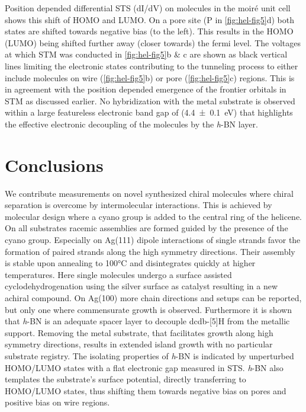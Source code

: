 Position depended differential STS (dI/dV) on molecules in the moir\'e unit cell shows this shift of HOMO and LUMO. On a pore site (P in \autoref{fig:hel-fig5}d) both states are shifted towards negative bias (to the left). This results in the HOMO (LUMO) being shifted further away (closer towards) the fermi level. The voltages at which STM was conducted in \autoref{fig:hel-fig5}b \& c are shown as black vertical lines limiting the electronic states contributing to the tunneling process to either include molecules on wire (\autoref{fig:hel-fig5}b) or pore (\autoref{fig:hel-fig5}c) regions. This is in agreement with the position depended emergence of the frontier orbitals in STM as discussed earlier. No hybridization with the metal substrate is observed within a large featureless electronic band gap of (\SI{4.4 \pm 0.1}{\eV}) that highlights the effective electronic decoupling of the molecules by the \textit{h}-BN layer.


\section{Conclusions}

We contribute measurements on novel synthesized chiral molecules where chiral separation is overcome by intermolecular interactions. This is achieved by molecular design where a cyano group is added to the central ring of the helicene. On all substrates racemic assemblies are formed guided by the presence of the cyano group. Especially on Ag(111) dipole interactions of single strands favor the formation of paired strands along the high symmetry directions. Their assembly is stable upon annealing to 100°C and disintegrates quickly at higher temperatures. Here single molecules undergo a surface assisted cyclodehydrogenation using the silver surface as catalyst resulting in a new achiral compound. On Ag(100) more chain directions and setups can be reported, but only one where commensurate growth is observed. Furthermore it is shown that \textit{h}-BN is an adequate spacer layer to decouple dcdb-[5]H from the metallic support. Removing the metal substrate, that facilitates growth along high symmetry directions, results in extended island growth with no particular substrate registry. The isolating properties of \textit{h}-BN is indicated by unperturbed HOMO/LUMO states with a flat electronic gap measured in STS. \textit{h}-BN also templates the substrate’s surface potential, directly transferring to HOMO/LUMO states, thus shifting them towards negative bias on pores and positive bias on wire regions. 
